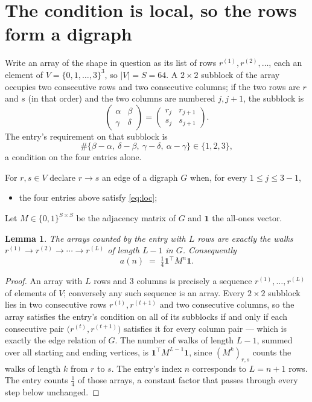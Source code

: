 \documentclass[11pt,a4paper]{article}
\theoremstyle{plain}
\newtheorem{lemma}[theorem]{Lemma}
\theoremstyle{definition}
\begin{document}
\section{The condition is local, so the rows form a digraph}

Write an array of the shape in question as its list of rows
$r^{(1)},r^{(2)},\dots$, each an element of
$V=\{0,1,\dots,3\}^{3}$, so $|V|=S=64$. A $2\times2$ subblock of the array
occupies two consecutive rows and two consecutive columns; if the two rows are $r$
and $s$ (in that order) and the two columns are numbered $j,j+1$,
the subblock is
\[
\begin{pmatrix}\alpha&\beta\\\gamma&\delta\end{pmatrix}=\begin{pmatrix}r_j&r_{j+1}\\s_j&s_{j+1}\end{pmatrix}.
\]
The entry's requirement on that subblock is
\begin{equation}\label{eq:loc}
\#\{\beta-\alpha,\ \delta-\beta,\ \gamma-\delta,\ \alpha-\gamma\}\in\{1,2,3\},
\end{equation}
a condition on the four entries alone.

For $r,s\in V$ declare $r\to s$ an edge of a digraph $G$ when, for every
$1\le j\le 3-1$,
\begin{itemize}
\item the four entries above satisfy \eqref{eq:loc};

\end{itemize}
Let $M\in\{0,1\}^{S\times S}$ be the adjacency matrix of $G$ and $\mathbf{1}$ the
all-ones vector.

\begin{lemma}\label{lem:walk}
The arrays counted by the entry with $L$ rows are exactly the walks
$r^{(1)}\to r^{(2)}\to\cdots\to r^{(L)}$ of length $L-1$ in $G$. Consequently
\[
a(n)\;=\;\tfrac1{4}\mathbf{1}^{\!\top}M^{n}\mathbf{1} .
\]
\end{lemma}

\begin{proof}
An array with $L$ rows and $3$ columns is precisely a sequence
$r^{(1)},\dots,r^{(L)}$ of elements of $V$; conversely any such sequence is an array.
Every $2\times2$ subblock lies in two consecutive rows $r^{(t)},r^{(t+1)}$ and two
consecutive columns, so the array satisfies the entry's condition on all of its subblocks
if and only if each consecutive pair $\bigl(r^{(t)},r^{(t+1)}\bigr)$ satisfies it for
every column pair --- which is exactly the edge relation of $G$. The number of walks of
length $L-1$, summed over all starting and ending vertices, is
$\mathbf{1}^{\!\top}M^{L-1}\mathbf{1}$, since $(M^{k})_{r,s}$ counts the walks of
length $k$ from $r$ to $s$. The entry's index $n$ corresponds to $L=n+1$ rows. The entry counts $\tfrac1{4}$ of those arrays, a constant factor that passes through every step below unchanged.
\end{proof}
\end{document}
